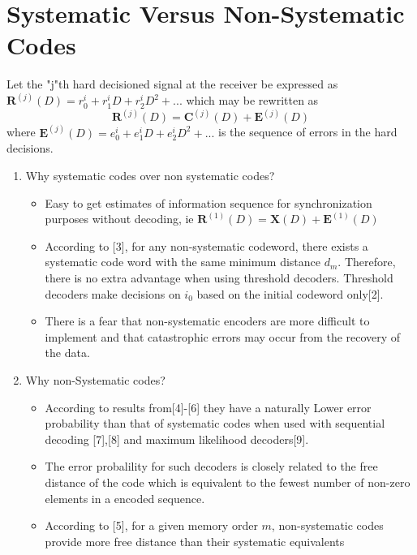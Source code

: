 \documentclass[fontsize=12pt]{article}
\begin{document}
\section{Systematic Versus Non-Systematic Codes}
Let the "j"th hard decisioned signal at the receiver be expressed as 
$\mathbf{\mathbf{R}}^{(j)}(D)=r^{i}_0+r^{i}_1D+r^{i}_2D^2+...$ which may be rewritten as 
\begin{equation}
\mathbf{\mathbf{R}}^{(j)}(D)=\mathbf{C}^{(j)}(D)+\mathbf{\mathbf{E}}^{(j)}(D)
\end{equation} 
where $\mathbf{\mathbf{E}}^{(j)}(D)=e^{i}_0+e^{i}_1D+e^{i}_2D^2+...$ is the sequence of errors in the hard decisions.
\begin{enumerate}
\item Why systematic codes over non systematic codes?

\begin{itemize}
\item Easy to get estimates of information sequence for synchronization purposes without decoding, ie $\mathbf{\mathbf{R}}^{(1)}(D)=\mathbf{X}(D)+\mathbf{\mathbf{E}}^{(1)}(D)$

\item According to [3], for any non-systematic codeword, there exists a systematic code word with the same minimum distance $d_m$. Therefore, there is no extra advantage when using threshold decoders. Threshold decoders make decisions on $i_0$ based on the initial codeword only[2].

\item There is a fear that non-systematic encoders are more difficult to implement and that catastrophic errors may occur from the recovery of the data.
\end{itemize}

\item Why non-Systematic codes?

\begin{itemize}
\item According to results from[4]-[6] they have a naturally Lower error probability than that of systematic codes when used with sequential decoding [7],[8] and maximum likelihood decoders[9].

\item The error probalility for such decoders is closely related to the free distance of the code which is equivalent to the fewest number of non-zero elements in a encoded sequence.

\item According to [5], for a given memory order $m$, non-systematic codes provide more free distance than their systematic equivalents
\end{itemize}

\end{enumerate}
\end{document}
